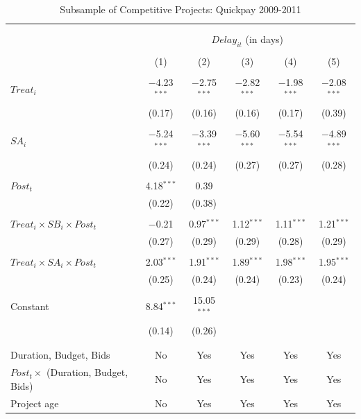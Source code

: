 \documentclass[
]{article}
\begin{document}
\begin{table}[H] \centering 
  \caption{Subsample of Competitive Projects: Quickpay 2009-2011} 
  \label{} 
\small 
\begin{tabular}{@{\extracolsep{-2pt}}lccccc} 
\\[-1.8ex]\hline 
\hline \\[-1.8ex] 
\\[-1.8ex] & \multicolumn{5}{c}{$Delay_{it}$ (in days)} \\ 
\\[-1.8ex] & (1) & (2) & (3) & (4) & (5)\\ 
\hline \\[-1.8ex] 
 $Treat_i$ & $-$4.23$^{***}$ & $-$2.75$^{***}$ & $-$2.82$^{***}$ & $-$1.98$^{***}$ & $-$2.08$^{***}$ \\ 
  & (0.17) & (0.16) & (0.16) & (0.17) & (0.39) \\ 
  & & & & & \\ 
 $SA_i$ & $-$5.24$^{***}$ & $-$3.39$^{***}$ & $-$5.60$^{***}$ & $-$5.54$^{***}$ & $-$4.89$^{***}$ \\ 
  & (0.24) & (0.24) & (0.27) & (0.27) & (0.28) \\ 
  & & & & & \\ 
 $Post_t$ & 4.18$^{***}$ & 0.39 &  &  &  \\ 
  & (0.22) & (0.38) &  &  &  \\ 
  & & & & & \\ 
 $Treat_i \times SB_i \times Post_t$ & $-$0.21 & 0.97$^{***}$ & 1.12$^{***}$ & 1.11$^{***}$ & 1.21$^{***}$ \\ 
  & (0.27) & (0.29) & (0.29) & (0.28) & (0.29) \\ 
  & & & & & \\ 
 $Treat_i \times SA_i \times Post_t$ & 2.03$^{***}$ & 1.91$^{***}$ & 1.89$^{***}$ & 1.98$^{***}$ & 1.95$^{***}$ \\ 
  & (0.25) & (0.24) & (0.24) & (0.23) & (0.24) \\ 
  & & & & & \\ 
 Constant & 8.84$^{***}$ & 15.05$^{***}$ &  &  &  \\ 
  & (0.14) & (0.26) &  &  &  \\ 
  & & & & & \\ 
\hline \\[-1.8ex] 
Duration, Budget, Bids & No & Yes & Yes & Yes & Yes \\ 
$Post_t \times $  (Duration, Budget, Bids) & No & Yes & Yes & Yes & Yes \\ 
Project age & No & Yes & Yes & Yes & Yes \\ 

\end{tabular}
\end{table}
\end{document}
